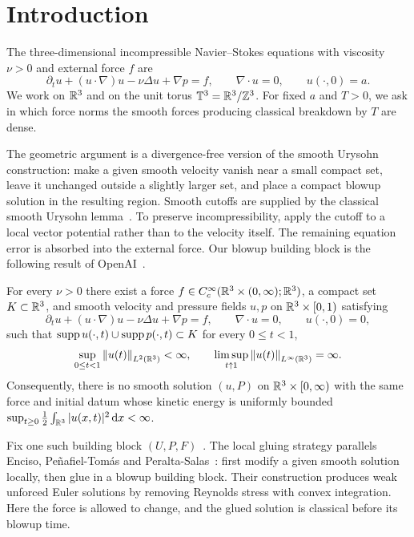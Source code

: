\section{Introduction}\label{sec:intro}
The three-dimensional incompressible Navier--Stokes equations with
viscosity $\nu>0$ and external force $f$ are
\begin{equation}\label{eq:NS}
 \partial_tu+(u\cdot\nabla)u-\nu\Delta u+\nabla p=f,
 \qquad \nabla\cdot u=0,\qquad u(\cdot,0)=a.
\end{equation}
We work on $\mathbb R^3$ and on the unit torus $\mathbb T^3=\mathbb R^3/\mathbb Z^3$.
For fixed $a$ and $T>0$, we ask in which force norms the smooth forces
producing classical breakdown by $T$ are dense.

The geometric argument is a divergence-free version of the smooth Urysohn
construction: make a given smooth velocity vanish near a small compact set,
leave it unchanged outside a slightly larger set, and place a compact blowup
solution in the resulting region. Smooth cutoffs are supplied by the classical
smooth Urysohn lemma~\cite[Corollary~1.3.4]{petersen}. To preserve
incompressibility, apply the cutoff to a local vector potential rather than
to the velocity itself. The remaining equation error is absorbed into the
external force. Our blowup building block is the following result of
OpenAI~\cite[Theorem~1.1]{openai}.

\begin{theorem}\label{thm:packet}
For every $\nu>0$ there exist a force
$f\in C_c^\infty(\mathbb R^3\times(0,\infty);\mathbb R^3)$, a compact set
$K\subset\mathbb R^3$, and smooth velocity and pressure fields $u,p$ on
$\mathbb R^3\times[0,1)$ satisfying
\begin{equation}\label{eq:packet}
 \partial_tu+(u\cdot\nabla)u-\nu\Delta u+\nabla p=f,
 \qquad \nabla\cdot u=0,\qquad u(\cdot,0)=0,
\end{equation}
such that $\operatorname{supp} u(\cdot,t)\cup\operatorname{supp} p(\cdot,t)\subset K$ for every
$0\le t<1$,
\begin{equation}\label{eq:packetblowup}
 \sup_{0\le t<1}\left\lVert u(t)\right\rVert_{L^2(\mathbb R^3)}<\infty,
 \qquad \limsup_{t\uparrow1}\left\lVert u(t)\right\rVert_{L^\infty(\mathbb R^3)}=\infty.
\end{equation}
Consequently, there is no smooth solution $(u,P)$ on
$\mathbb R^3\times[0,\infty)$ with the same force and initial datum whose
kinetic energy is uniformly bounded
$\sup_{t\ge0}\frac12\int_{\mathbb R^3}|u(x,t)|^2\,\mathrm d x<\infty$.
\end{theorem}

Fix one such building block $(U,P,F)$~\cite{openai,lean}.
The local gluing strategy parallels
Enciso, Pe\~nafiel-Tom\'as and Peralta-Salas~\cite[Theorem~1.5,
Lemma~2.11, Sections~11.1 and~11.3]{eppt2025}: first modify a given smooth
solution locally, then glue in a blowup building block. Their construction
produces weak unforced Euler solutions by removing Reynolds stress with
convex integration. Here the force is allowed to change, and the glued
solution is classical before its blowup time.

